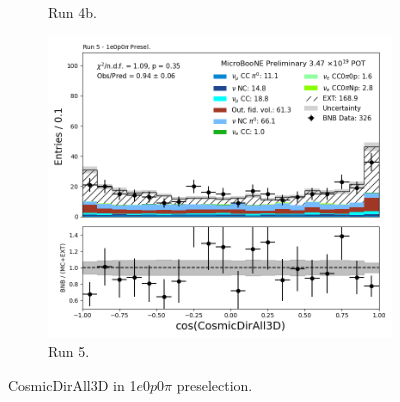 \begin{figure}[H]
\begin{subfigure}[t]{0.32\linewidth}
        \caption{Run 4b.}
    \end{subfigure}%
    \hspace{0.2cm}%
    \begin{subfigure}[t]{0.32\linewidth}
        \includegraphics[width=\linewidth]{technote/Appendix_Preselection/Figures/1e0p0pi/Run5/CosmicDirAll3D_Run5_1e0p0pi_Presel.png}
        \caption{Run 5.}
    \end{subfigure}
    \caption{CosmicDirAll3D in 1$e$0$p$0$\pi$ preselection.}
\end{figure}

